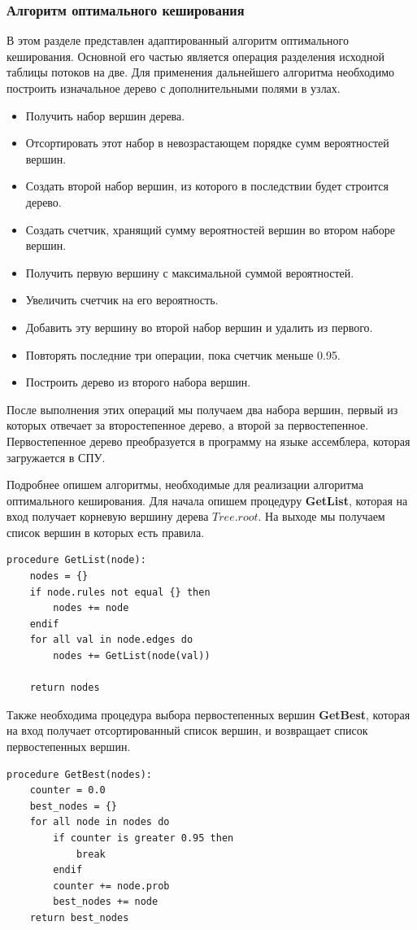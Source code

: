 \documentclass[oneside,final,12pt]{extarticle}
\begin{document}
            \subsubsection{Алгоритм оптимального кеширования}
                В этом разделе представлен адаптированный алгоритм оптимального кеширования. 
                Основной его частью является операция разделения исходной таблицы потоков на две. 
                Для применения дальнейшего алгоритма необходимо построить изначальное дерево с дополнительными полями в узлах.
                \begin{itemize}
                    \item Получить набор вершин дерева.
                    \item Отсортировать этот набор в невозрастающем порядке сумм вероятностей вершин.
                    \item Создать второй набор вершин, из которого в последствии будет строится дерево.
                    \item Создать счетчик, хранящий сумму вероятностей вершин во втором наборе вершин.
                    \item Получить первую вершину с максимальной суммой вероятностей.
                    \item Увеличить счетчик на его вероятность.
                    \item Добавить эту вершину во второй набор вершин и удалить из первого.
                    \item Повторять последние три операции, пока счетчик меньше 0.95.
                    \item Построить дерево из второго набора вершин.
                \end{itemize}
                После выполнения этих операций мы получаем два набора вершин, первый из которых отвечает за второстепенное дерево, а второй за первостепенное.
                Первостепенное дерево преобразуется в программу на языке ассемблера, которая загружается в СПУ.

                Подробнее опишем алгоритмы, необходимые для реализации алгоритма оптимального кеширования.
                Для начала опишем процедуру {\bf GetList}, которая на вход получает корневую вершину дерева \(Tree.root\). 
                На выходе мы получаем список вершин в которых есть правила.
\begin{lstlisting}
procedure GetList(node):
    nodes = {}
    if node.rules not equal {} then
        nodes += node
    endif
    for all val in node.edges do
        nodes += GetList(node(val))

    return nodes
\end{lstlisting}
                    Также необходима процедура выбора первостепенных вершин {\bf GetBest}, которая на вход получает отсортированный список вершин,
                    и возвращает список первостепенных вершин.
\begin{lstlisting}
procedure GetBest(nodes):
    counter = 0.0
    best_nodes = {}
    for all node in nodes do
        if counter is greater 0.95 then
            break
        endif
        counter += node.prob
        best_nodes += node
    return best_nodes
\end{lstlisting}
\end{document}
